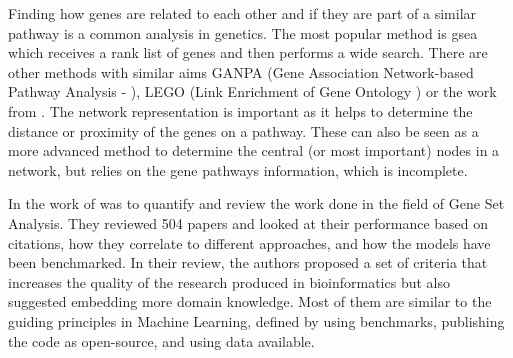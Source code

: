 Finding how genes are related to each other and if they are part of a similar pathway is a common analysis in genetics. The most popular method is \acrlong{gsea} which receives a rank list of genes and then performs a wide search. There are other methods with similar aims GANPA (Gene Association Network-based Pathway Analysis - \citep{Fang2012-vr}), LEGO (Link Enrichment of Gene Ontology \citep{Dong2016-zs}) or the work from \citet{Cava2018-rv}. The network representation is important as it helps to determine the distance or proximity of the genes on a pathway. These can also be seen as a more advanced method to determine the central (or most important) nodes in a network, but relies on the gene pathways information, which is incomplete.

In the work of \citep{Xie2021-al} was to quantify and review the work done in the field of Gene Set Analysis. They reviewed 504 papers and looked at their performance based on citations, how they correlate to different approaches, and how the models have been benchmarked. In their review, the authors proposed a set of criteria that increases the quality of the research produced in bioinformatics but also suggested embedding more domain knowledge. Most of them are similar to the guiding principles in Machine Learning, defined by using benchmarks, publishing the code as open-source, and using data available.



